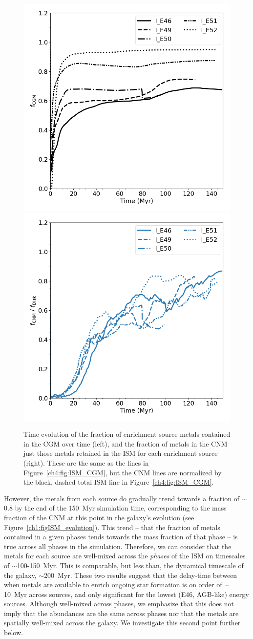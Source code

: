 \begin{figure}
  \centering
  \includegraphics[width=0.45\linewidth]{figures/ch4/CGM_average_evolution}
  \includegraphics[width=0.45\linewidth]{figures/ch4/CNM_average_evolution}
  \caption{Time evolution of the fraction of enrichment source metals contained in the CGM over time (left), and the fraction of metals in the CNM just those metals retained in the ISM for each enrichment source (right). These are the same as the lines in Figure~\ref{ch4:fig:ISM_CGM}, but the CNM lines are normalized by the black, dashed total ISM line in Figure~\ref{ch4:fig:ISM_CGM}.}
  \label{ch4:fig:CGM_CNM}
\end{figure}

However, the metals from each source do gradually trend towards a fraction of $\sim$0.8 by the end of the 150~Myr simulation time, corresponding to the mass fraction of the CNM at this point in the galaxy's evolution (see Figure~\ref{ch1:figISM_evolution}). This trend -- that the fraction of metals contained in a given phases tends towards the mass fraction of that phase -- is true across all phases in the simulation. Therefore, we can consider that the metals for each source are well-mixed across the \textit{phases} of the ISM on timescales of $\sim$100-150~Myr. This is comparable, but less than, the dynamical timescale of the galaxy, $\sim$200~Myr. These two results suggest that the delay-time between when metals are available to enrich ongoing star formation is on order of $\sim$10~Myr across sources, and only significant for the lowest (E46, AGB-like) energy sources. Although well-mixed across phases, we emphasize that this does not imply that the abundances are the same across phases nor that the metals are spatially well-mixed across the galaxy. We investigate this second point further below.

